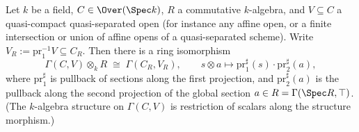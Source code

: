 \begin{theorem}
  \label{thm:sectionsBaseChange}
  \leanok
  Let \(k\) be a field, \(C \in \Over(\Spec k)\), \(R\) a commutative \(k\)-algebra, and
  \(V \subseteq C\) a quasi-compact quasi-separated open (for instance any affine open,
  or a finite intersection or union of affine opens of a quasi-separated scheme). Write
  \(V_R := \mathrm{pr}_1^{-1} V \subseteq C_R\). Then there is a ring isomorphism
  \[
    \Gamma(C, V) \otimes_k R \;\cong\; \Gamma(C_R, V_R), \qquad
    s \otimes a \longmapsto \mathrm{pr}_1^{\sharp}(s) \cdot \mathrm{pr}_2^{\sharp}(a),
  \]
  where \(\mathrm{pr}_1^{\sharp}\) is pullback of sections along the first projection,
  and \(\mathrm{pr}_2^{\sharp}(a)\) is the pullback along the second projection of the
  global section \(a \in R = \Gamma(\Spec R, \top)\). (The \(k\)-algebra structure on
  \(\Gamma(C, V)\) is restriction of scalars along the structure morphism.)
\end{theorem}
